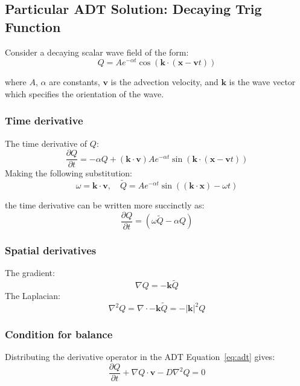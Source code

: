 \documentclass[11pt]{article}
\renewcommand{\vec}[1]{\bm{#1}}
\begin{document}
\subsection{Particular ADT Solution: Decaying Trig Function}
Consider a decaying scalar wave field of the form:
\begin{equation}
Q = A e^{-\alpha t} \cos\left(\vec{k} \cdot (\vec{x} - \vec{v} t)\right)
\end{equation}

where $A$, $\alpha$ are constants, $\vec{v}$ is the advection velocity, and $\vec{k}$ is the wave vector which specifies the orientation of the wave.

\subsubsection{Time derivative}

The time derivative of $Q$:
\[
\frac{\partial Q}{\partial t} = -\alpha Q + (\vec{k} \cdot \vec{v}) A e^{-\alpha t}\sin\left(\vec{k} \cdot (\vec{x} - \vec{v} t)\right)
\]
Making the following substitution:
\begin{equation}
 \omega=\vec{k}\cdot\vec{v}, \quad \tilde{Q} = A e^{-\alpha t}\sin\left((\vec{k} \cdot \vec{x}) - \omega t\right)
\end{equation}

the time derivative can be written more succinctly as:
\begin{equation}
  \frac{\partial Q}{\partial t} = \left(\omega \tilde{Q} - \alpha Q\right)
  \label{eq:dt}
\end{equation}


\subsubsection{Spatial derivatives}
The gradient:
\begin{equation}
  \nabla Q = -\vec{k}\tilde{Q}
  \label{eq:dx}
\end{equation}
The Laplacian:
\begin{equation}
  \nabla^2 Q = \nabla \cdot -\vec{k}\tilde{Q} = -|\vec{k}|^2 Q
  \label{eq:d2x}
\end{equation}

\subsubsection{Condition for balance}

Distributing the derivative operator in the ADT Equation~\ref{eq:adt} gives:
\[
\frac{\partial Q}{\partial t} + \nabla Q \cdot \vec{v} - D \nabla^2 Q = 0
\]
\end{document}
